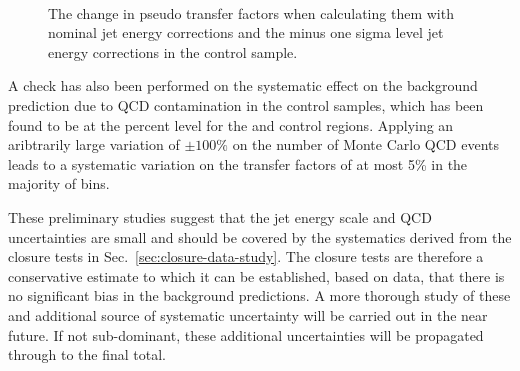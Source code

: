\begin{figure}[]
  \centering
   ~~
  \caption{\label{fig:jes-syst-doubleMu} The change in pseudo transfer
  factors when calculating them with nominal jet energy corrections
  and the minus one sigma level jet energy corrections in the \mmj
  control sample.}
\end{figure}


A check has also been performed on the systematic effect on the background 
prediction due to QCD contamination in the control samples, which has been found
to be at the percent level for the \mj and \gj control regions. Applying an
aribtrarily large variation of $\pm 100\%$ on the number of Monte Carlo QCD
events leads to a systematic variation on the transfer factors of at most 5\% in
the majority of bins.

These preliminary studies suggest that the jet energy scale and QCD
uncertainties are small and should be covered by the systematics derived from the
closure tests in Sec.~\ref{sec:closure-data-study}. The closure tests are
therefore a conservative estimate to which it can be established, based on data, 
that there is no significant bias in the background predictions. A more thorough 
study of these and additional source of systematic uncertainty will be carried 
out in the near future. If not sub-dominant, these additional uncertainties will
be propagated through to the final total.


